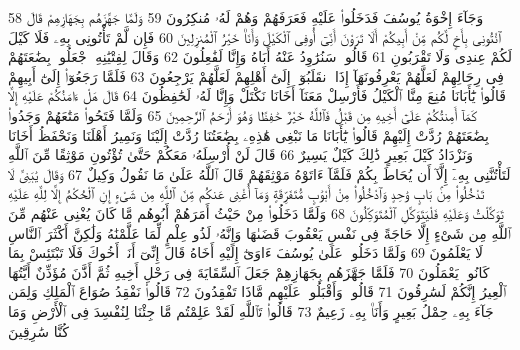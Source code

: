{\tiny\colorbox{cl_aya}{58}} وَجَآءَ إِخْوَةُ يُوسُفَ فَدَخَلُوا۟ عَلَيْهِ فَعَرَفَهُمْ وَهُمْ لَهُۥ مُنكِرُونَ
{\tiny\colorbox{cl_aya}{59}} وَلَمَّا جَهَّزَهُم بِجَهَازِهِمْ قَالَ ٱئْتُونِى بِأَخٍ لَّكُم مِّنْ أَبِيكُمْ أَلَا تَرَوْنَ أَنِّىٓ أُوفِى ٱلْكَيْلَ وَأَنَا۠ خَيْرُ ٱلْمُنزِلِينَ
{\tiny\colorbox{cl_aya}{60}} فَإِن لَّمْ تَأْتُونِى بِهِۦ فَلَا كَيْلَ لَكُمْ عِندِى وَلَا تَقْرَبُونِ
{\tiny\colorbox{cl_aya}{61}} قَالُوا۟ سَنُرَٰوِدُ عَنْهُ أَبَاهُ وَإِنَّا لَفَٰعِلُونَ
{\tiny\colorbox{cl_aya}{62}} وَقَالَ لِفِتْيَٰنِهِ ٱجْعَلُوا۟ بِضَٰعَتَهُمْ فِى رِحَالِهِمْ لَعَلَّهُمْ يَعْرِفُونَهَآ إِذَا ٱنقَلَبُوٓا۟ إِلَىٰٓ أَهْلِهِمْ لَعَلَّهُمْ يَرْجِعُونَ
{\tiny\colorbox{cl_aya}{63}} فَلَمَّا رَجَعُوٓا۟ إِلَىٰٓ أَبِيهِمْ قَالُوا۟ يَٰٓأَبَانَا مُنِعَ مِنَّا ٱلْكَيْلُ فَأَرْسِلْ مَعَنَآ أَخَانَا نَكْتَلْ وَإِنَّا لَهُۥ لَحَٰفِظُونَ
{\tiny\colorbox{cl_aya}{64}} قَالَ هَلْ ءَامَنُكُمْ عَلَيْهِ إِلَّا كَمَآ أَمِنتُكُمْ عَلَىٰٓ أَخِيهِ مِن قَبْلُ فَٱللَّهُ خَيْرٌ حَٰفِظًا وَهُوَ أَرْحَمُ ٱلرَّٰحِمِينَ
{\tiny\colorbox{cl_aya}{65}} وَلَمَّا فَتَحُوا۟ مَتَٰعَهُمْ وَجَدُوا۟ بِضَٰعَتَهُمْ رُدَّتْ إِلَيْهِمْ قَالُوا۟ يَٰٓأَبَانَا مَا نَبْغِى هَٰذِهِۦ بِضَٰعَتُنَا رُدَّتْ إِلَيْنَا وَنَمِيرُ أَهْلَنَا وَنَحْفَظُ أَخَانَا وَنَزْدَادُ كَيْلَ بَعِيرٍ ذَٰلِكَ كَيْلٌ يَسِيرٌ
{\tiny\colorbox{cl_aya}{66}} قَالَ لَنْ أُرْسِلَهُۥ مَعَكُمْ حَتَّىٰ تُؤْتُونِ مَوْثِقًا مِّنَ ٱللَّهِ لَتَأْتُنَّنِى بِهِۦٓ إِلَّآ أَن يُحَاطَ بِكُمْ فَلَمَّآ ءَاتَوْهُ مَوْثِقَهُمْ قَالَ ٱللَّهُ عَلَىٰ مَا نَقُولُ وَكِيلٌ
{\tiny\colorbox{cl_aya}{67}} وَقَالَ يَٰبَنِىَّ لَا تَدْخُلُوا۟ مِنۢ بَابٍ وَٰحِدٍ وَٱدْخُلُوا۟ مِنْ أَبْوَٰبٍ مُّتَفَرِّقَةٍ وَمَآ أُغْنِى عَنكُم مِّنَ ٱللَّهِ مِن شَىْءٍ إِنِ ٱلْحُكْمُ إِلَّا لِلَّهِ عَلَيْهِ تَوَكَّلْتُ وَعَلَيْهِ فَلْيَتَوَكَّلِ ٱلْمُتَوَكِّلُونَ
{\tiny\colorbox{cl_aya}{68}} وَلَمَّا دَخَلُوا۟ مِنْ حَيْثُ أَمَرَهُمْ أَبُوهُم مَّا كَانَ يُغْنِى عَنْهُم مِّنَ ٱللَّهِ مِن شَىْءٍ إِلَّا حَاجَةً فِى نَفْسِ يَعْقُوبَ قَضَىٰهَا وَإِنَّهُۥ لَذُو عِلْمٍ لِّمَا عَلَّمْنَٰهُ وَلَٰكِنَّ أَكْثَرَ ٱلنَّاسِ لَا يَعْلَمُونَ
{\tiny\colorbox{cl_aya}{69}} وَلَمَّا دَخَلُوا۟ عَلَىٰ يُوسُفَ ءَاوَىٰٓ إِلَيْهِ أَخَاهُ قَالَ إِنِّىٓ أَنَا۠ أَخُوكَ فَلَا تَبْتَئِسْ بِمَا كَانُوا۟ يَعْمَلُونَ
{\tiny\colorbox{cl_aya}{70}} فَلَمَّا جَهَّزَهُم بِجَهَازِهِمْ جَعَلَ ٱلسِّقَايَةَ فِى رَحْلِ أَخِيهِ ثُمَّ أَذَّنَ مُؤَذِّنٌ أَيَّتُهَا ٱلْعِيرُ إِنَّكُمْ لَسَٰرِقُونَ
{\tiny\colorbox{cl_aya}{71}} قَالُوا۟ وَأَقْبَلُوا۟ عَلَيْهِم مَّاذَا تَفْقِدُونَ
{\tiny\colorbox{cl_aya}{72}} قَالُوا۟ نَفْقِدُ صُوَاعَ ٱلْمَلِكِ وَلِمَن جَآءَ بِهِۦ حِمْلُ بَعِيرٍ وَأَنَا۠ بِهِۦ زَعِيمٌ
{\tiny\colorbox{cl_aya}{73}} قَالُوا۟ تَٱللَّهِ لَقَدْ عَلِمْتُم مَّا جِئْنَا لِنُفْسِدَ فِى ٱلْأَرْضِ وَمَا كُنَّا سَٰرِقِينَ
